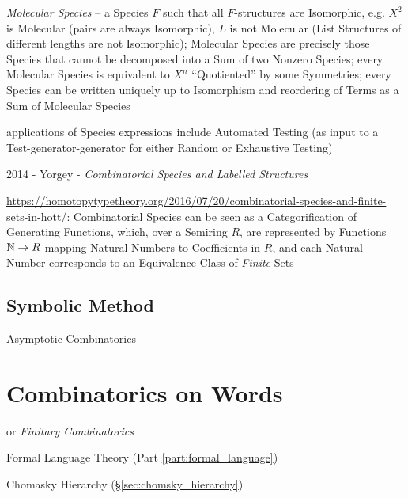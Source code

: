 \emph{Molecular Species} -- a Species $F$ such that all $F$-structures are
Isomorphic, e.g. $X^2$ is Molecular (pairs are always Isomorphic), $L$ is not
Molecular (List Structures of different lengths are not Isomorphic); Molecular
Species are precisely those Species that cannot be decomposed into a Sum of two
Nonzero Species; every Molecular Species is equivalent to $X^n$
``Quotiented'' by some Symmetries; every Species can be written uniquely up to
Isomorphism and reordering of Terms as a Sum of Molecular Species

applications of Species expressions include Automated Testing (as input to a
Test-generator-generator for either Random or Exhaustive Testing)

2014 - Yorgey - \emph{Combinatorial Species and Labelled Structures}

\url{https://homotopytypetheory.org/2016/07/20/combinatorial-species-and-finite-sets-in-hott/}:
Combinatorial Species can be seen as a Categorification of Generating Functions,
which, over a Semiring $R$, are represented by Functions $\mathbb{N} \rightarrow R$
mapping Natural Numbers to Coefficients in $R$, and each Natural Number
corresponds to an Equivalence Class of \emph{Finite} Sets



\subsection{Symbolic Method}\label{sec:symbolic_method}

Asymptotic Combinatorics



\section{Combinatorics on Words}\label{sec:combinatorics_on_words}

or \emph{Finitary Combinatorics}

Formal Language Theory (Part \ref{part:formal_language})

Chomasky Hierarchy (\S\ref{sec:chomsky_hierarchy})



